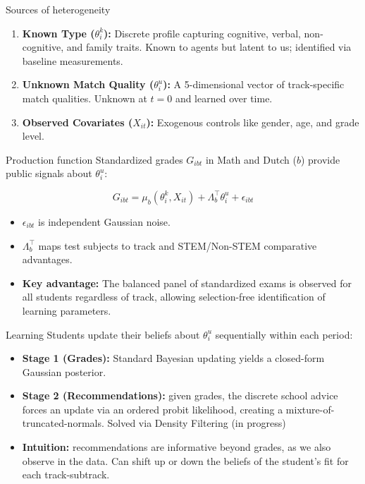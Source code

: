 \documentclass[10pt,aspectratio=169]{beamer}
\begin{document}
\begin{frame}{Sources of heterogeneity}
    \begin{enumerate}
        \item \textbf{Known Type ($\theta^k_i$):} Discrete profile capturing cognitive, verbal, non-cognitive, and family traits. Known to agents but latent to us; identified via baseline measurements.
        \item \textbf{Unknown Match Quality ($\theta^u_i$):} A 5-dimensional vector of track-specific match qualities. Unknown at $t=0$ and learned over time.
        \item \textbf{Observed Covariates ($X_{it}$):} Exogenous controls like gender, age, and grade level.
    \end{enumerate}
\end{frame}

\begin{frame}{Production function}
    Standardized grades $G_{ibt}$ in Math and Dutch ($b$) provide public signals about $\theta^u_i$:
    
    $$G_{ibt} = \mu_b(\theta^k_i, X_{it}) + \Lambda_b^\top \theta^u_i + \epsilon_{ibt}$$
    
    \begin{itemize}
        \item $\epsilon_{ibt}$ is independent Gaussian noise.
        \item $\Lambda_b^\top$ maps test subjects to track and STEM/Non-STEM comparative advantages.
        \item \textbf{Key advantage:} The balanced panel of standardized exams is observed for all students regardless of track, allowing selection-free identification of learning parameters.
    \end{itemize}
\end{frame}

\begin{frame}{Learning}
    Students update their beliefs about $\theta^u_i$ sequentially within each period:
    
    \begin{itemize}
        \item \textbf{Stage 1 (Grades):} Standard Bayesian updating yields a closed-form Gaussian posterior.
        \item \textbf{Stage 2 (Recommendations):} given grades, the discrete school advice forces an update via an ordered probit likelihood, creating a mixture-of-truncated-normals. Solved via Density Filtering (in progress)
        \item \textbf{Intuition:} recommendations are informative beyond grades, as we also observe in the data. Can shift up or down the beliefs of the student's fit for each track-subtrack. 
    \end{itemize}
\end{frame}
\end{document}
